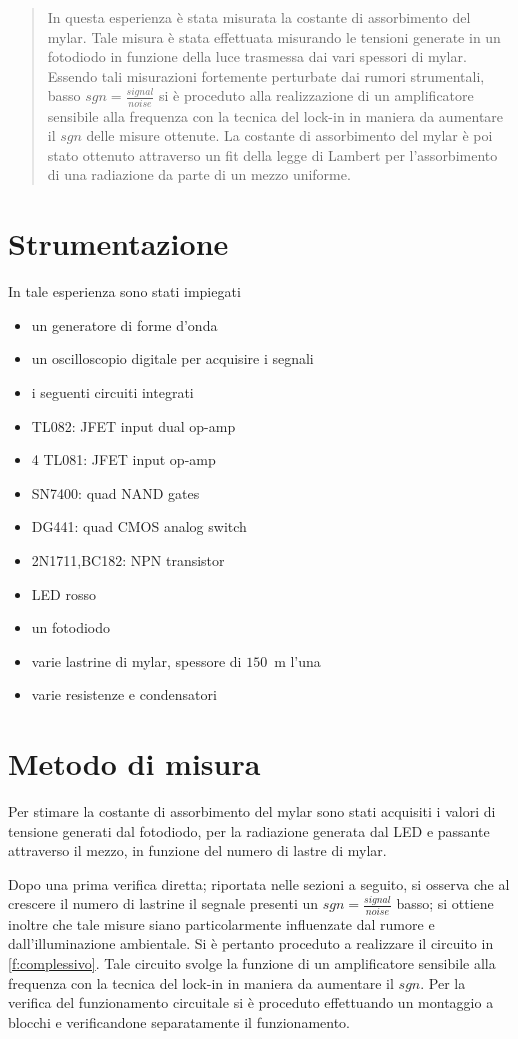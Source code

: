 \begin{abstract}
	In questa esperienza è stata misurata la costante di assorbimento del mylar.
	Tale misura è stata effettuata misurando le tensioni generate in un fotodiodo in funzione della luce trasmessa dai vari spessori di mylar.
	Essendo tali misurazioni fortemente perturbate dai rumori strumentali, basso $sgn=\frac{signal}{noise}$ 
	si è proceduto alla realizzazione di un amplificatore sensibile alla frequenza con la tecnica del lock-in
	in maniera da aumentare il $sgn$ delle misure ottenute.
	La costante di assorbimento del mylar è poi stato ottenuto attraverso un fit della 
	legge di Lambert per l'assorbimento di una radiazione da parte di un mezzo uniforme.
\end{abstract}

\section{Strumentazione}
	In tale esperienza sono stati impiegati 
	\begin{itemize}
		\item un generatore di forme d'onda
		\item un oscilloscopio digitale per acquisire i segnali
		\item i seguenti circuiti integrati 
			\item TL082: JFET input dual op-amp
			\item 4 TL081: JFET input op-amp
			\item SN7400: quad NAND gates
			\item DG441: quad CMOS analog switch
			\item 2N1711,BC182: NPN transistor
			\item LED rosso
			\item un fotodiodo
			\item varie lastrine di mylar, spessore di $150$\si{\mu \metre} l'una
			\item varie resistenze e condensatori
	\end{itemize}
\section{Metodo di misura }
	Per stimare la costante di assorbimento del mylar sono stati acquisiti i valori di tensione generati 
	dal fotodiodo, per la radiazione generata dal LED e passante attraverso il mezzo,
	in funzione del numero di lastre di mylar.
	
	Dopo una prima verifica diretta; riportata nelle sezioni a seguito, si osserva che al crescere il
	numero di lastrine il segnale presenti un $sgn=\frac{signal}{noise}$ basso;
	si ottiene inoltre che tale misure siano particolarmente influenzate dal rumore e 
	dall'illuminazione ambientale.
	Si è pertanto proceduto a realizzare il circuito in \figurename{ \ref{f:complessivo}}.
	Tale circuito svolge la funzione di un amplificatore sensibile alla frequenza con la tecnica del lock-in in maniera da aumentare il $sgn$.
	Per la verifica del funzionamento circuitale si è proceduto effettuando un montaggio a blocchi
	e verificandone separatamente il funzionamento.
	
